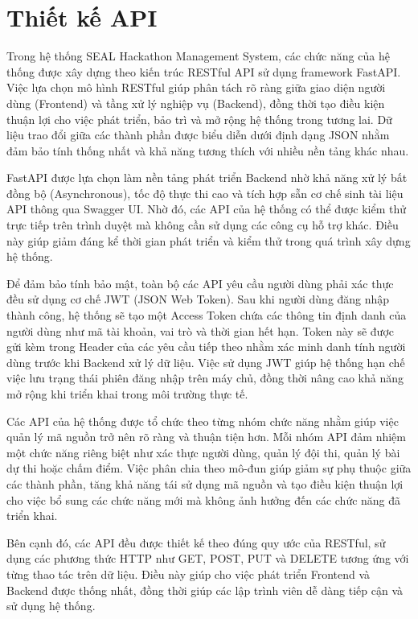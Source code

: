 ﻿%
\section{Thiết kế API}

Trong hệ thống SEAL Hackathon Management System, các chức năng của hệ thống được xây dựng theo kiến trúc RESTful API sử dụng framework FastAPI. Việc lựa chọn mô hình RESTful giúp phân tách rõ ràng giữa giao diện người dùng (Frontend) và tầng xử lý nghiệp vụ (Backend), đồng thời tạo điều kiện thuận lợi cho việc phát triển, bảo trì và mở rộng hệ thống trong tương lai. Dữ liệu trao đổi giữa các thành phần được biểu diễn dưới định dạng JSON nhằm đảm bảo tính thống nhất và khả năng tương thích với nhiều nền tảng khác nhau.

FastAPI được lựa chọn làm nền tảng phát triển Backend nhờ khả năng xử lý bất đồng bộ (Asynchronous), tốc độ thực thi cao và tích hợp sẵn cơ chế sinh tài liệu API thông qua Swagger UI. Nhờ đó, các API của hệ thống có thể được kiểm thử trực tiếp trên trình duyệt mà không cần sử dụng các công cụ hỗ trợ khác. Điều này giúp giảm đáng kể thời gian phát triển và kiểm thử trong quá trình xây dựng hệ thống.

Để đảm bảo tính bảo mật, toàn bộ các API yêu cầu người dùng phải xác thực đều sử dụng cơ chế JWT (JSON Web Token). Sau khi người dùng đăng nhập thành công, hệ thống sẽ tạo một Access Token chứa các thông tin định danh của người dùng như mã tài khoản, vai trò và thời gian hết hạn. Token này sẽ được gửi kèm trong Header của các yêu cầu tiếp theo nhằm xác minh danh tính người dùng trước khi Backend xử lý dữ liệu. Việc sử dụng JWT giúp hệ thống hạn chế việc lưu trạng thái phiên đăng nhập trên máy chủ, đồng thời nâng cao khả năng mở rộng khi triển khai trong môi trường thực tế.

Các API của hệ thống được tổ chức theo từng nhóm chức năng nhằm giúp việc quản lý mã nguồn trở nên rõ ràng và thuận tiện hơn. Mỗi nhóm API đảm nhiệm một chức năng riêng biệt như xác thực người dùng, quản lý đội thi, quản lý bài dự thi hoặc chấm điểm. Việc phân chia theo mô-đun giúp giảm sự phụ thuộc giữa các thành phần, tăng khả năng tái sử dụng mã nguồn và tạo điều kiện thuận lợi cho việc bổ sung các chức năng mới mà không ảnh hưởng đến các chức năng đã triển khai.

Bên cạnh đó, các API đều được thiết kế theo đúng quy ước của RESTful, sử dụng các phương thức HTTP như GET, POST, PUT và DELETE tương ứng với từng thao tác trên dữ liệu. Điều này giúp cho việc phát triển Frontend và Backend được thống nhất, đồng thời giúp các lập trình viên dễ dàng tiếp cận và sử dụng hệ thống.

